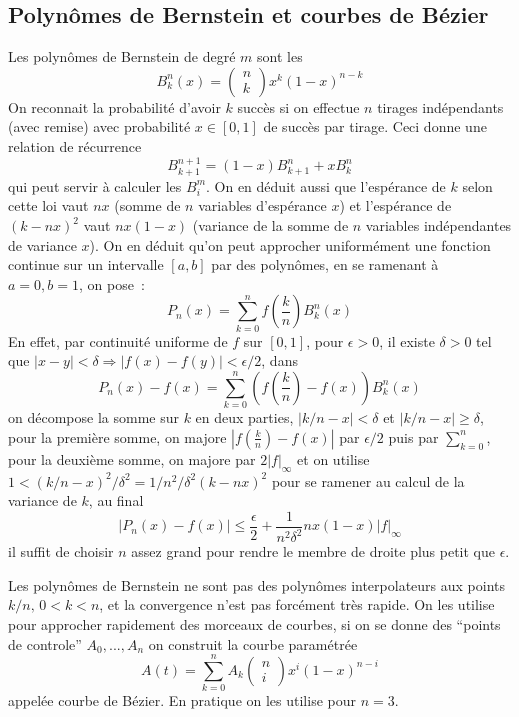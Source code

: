 \documentclass[a4paper,11pt]{article}
\begin{document}
\begin{giacjshere}
\subsection{Polyn\^omes de Bernstein et courbes de
  B\'ezier} 
Les polyn\^omes de Bernstein de degr\'e $m$ sont les
$$ B^n_k (x) = 
\left( \begin{array}{c} n \\ k \end{array} \right) x^k (1-x)^{n-k}$$
On reconnait la probabilit\'e d'avoir $k$ succ\`es si on effectue $n$
tirages ind\'ependants (avec remise) 
avec probabilit\'e $x \in [0,1]$ de succ\`es par tirage. Ceci donne
une relation de r\'ecurrence
$$ B^{n+1}_{k+1}=(1-x)B^n_{k+1}+x B^n_k $$
qui peut servir \`a calculer les $B^m_i$. On en d\'eduit aussi que l'esp\'erance
de $k$ selon cette loi vaut $nx$ (somme de $n$ variables d'esp\'erance
$x$) et l'esp\'erance de $(k-nx)^2$ vaut
$nx(1-x)$ (variance de la somme de $n$ variables ind\'ependantes
de variance $x$).
On en d\'eduit qu'on peut approcher uniform\'ement une
fonction continue sur un intervalle $[a,b]$ par des polyn\^omes, en
se ramenant \`a $a=0, b=1$, on pose~:
$$ P_n(x) = \sum_{k=0}^n f(\frac{k}{n}) B^n_k(x) $$
En effet, par continuit\'e uniforme de $f$ sur $[0,1]$, pour
$\epsilon>0$,
il existe $\delta>0$ tel que $|x-y|<\delta \Rightarrow
|f(x)-f(y)|<\epsilon/2$,
dans
$$P_n(x)-f(x)=\sum_{k=0}^n (f(\frac{k}{n})-f(x)) B^n_k(x)$$
on d\'ecompose la somme sur $k$ en deux parties, $|k/n-x|<\delta$
et $|k/n-x| \geq \delta$, pour la premi\`ere somme, on majore
$|f(\frac{k}{n})-f(x)|$ par $\epsilon/2$ puis par $\sum_{k=0}^n$,
pour la deuxi\`eme somme, on majore par $2|f|_\infty$ et on utilise
$1<(k/n-x)^2/\delta^2=1/n^2/\delta^2 (k-nx)^2$ pour se ramener au calcul
de la variance de $k$, au final
$$ |P_n(x)-f(x)| \leq \frac \epsilon 2 + \frac{1}{n^2 \delta^2} nx(1-x)|f|_\infty$$
il suffit de choisir $n$ assez grand pour rendre le membre de droite
plus petit que $\epsilon$.

Les polyn\^omes de Bernstein ne sont pas des polyn\^omes
interpolateurs aux points $k/n, \, 0<k<n$, et la convergence
n'est pas forc\'ement tr\`es rapide.
On les utilise pour approcher rapidement des morceaux de
courbes, si on se donne des ``points de controle'' $A_0, ..., A_n$
on construit la courbe param\'etr\'ee
$$ A(t) = \sum_{k=0}^n A_k \left( \begin{array}{c} n\\ i \end{array} \right) x^i
(1-x)^{n-i} $$
appel\'ee courbe de B\'ezier. En pratique on les utilise pour $n=3$.


\end{giacjshere}
\end{document}
